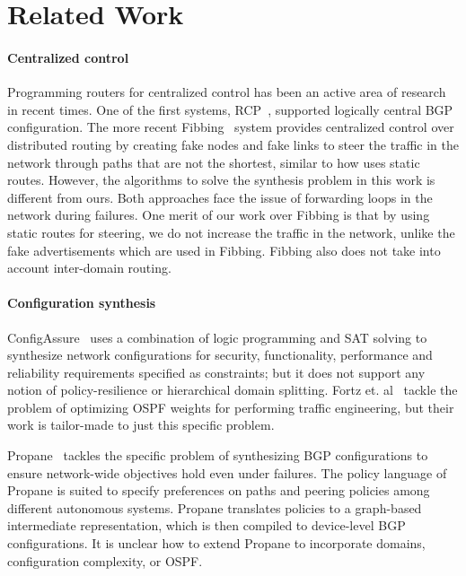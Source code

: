 \section{Related Work}\label{sec:related}
\paragraph{Centralized control} Programming routers for centralized
control has been an active area of research in recent times. One of
the first systems, RCP~\cite{rcp}, supported logically central BGP
configuration. The more recent Fibbing~\cite{fibbing} system provides
centralized control over distributed routing by creating fake nodes
and fake links to steer the traffic in the network through paths that
are not the shortest, similar to how \name uses static routes. 
However, the algorithms to solve the synthesis problem 
in this work is different from ours.  
Both approaches face the issue of  
forwarding loops in the network during failures. 
One merit of our work over Fibbing is that by using 
static routes for steering, we do not increase the 
traffic in the network, unlike the fake advertisements 
which are used in Fibbing. Fibbing also does not take into
account inter-domain routing.



\paragraph{Configuration synthesis} 
ConfigAssure~\cite{configassure}
uses a combination of logic programming and SAT solving to synthesize
network configurations for security, 
functionality, performance and
reliability requirements specified as constraints; 
but it does not
support any notion of policy-resilience 
or hierarchical domain splitting.  Fortz
et. al~\cite{ospf-te} tackle the problem of optimizing OSPF weights
for performing traffic engineering, but their work is tailor-made
to just this specific problem.

Propane~\cite{propane} tackles the specific problem of synthesizing
BGP configurations to ensure network-wide objectives hold even under
failures. The policy language of Propane is suited to specify
preferences on paths and peering policies among different autonomous
systems. Propane translates policies
to a graph-based intermediate representation, which is then compiled
to device-level BGP configurations. It is unclear how to extend
Propane to incorporate domains, configuration complexity, or OSPF.

